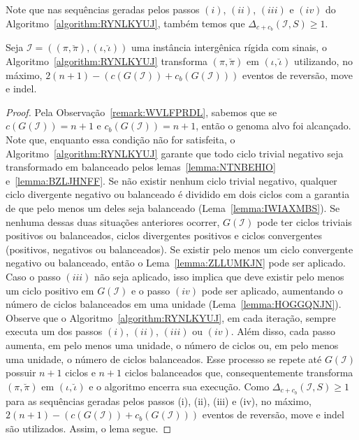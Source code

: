 Note que nas sequências geradas pelos passos $(i)$, $(ii)$, $(iii)$ e $(iv)$ do Algoritmo~\ref{algorithm:RYNLKYUJ}, também temos que $\Delta_{c+c_b}(\mathcal{I},S) \ge 1$.

\begin{lemma}\label{lemma:PBDEKMXG}
Seja $\mathcal{I} = ((\pi,\breve\pi),(\iota,\breve\iota))$ uma instância intergênica rígida com sinais, o Algoritmo~\ref{algorithm:RYNLKYUJ} transforma $(\pi,\breve\pi)$ em $(\iota,\breve\iota)$ utilizando, no máximo, $2(n + 1) - (c(G(\mathcal{I})) + c_b(G(\mathcal{I})))$ eventos de reversão, move e indel.
\end{lemma}
\begin{proof}
Pela Observação~\ref{remark:WVLFPRDL}, sabemos que se $c(G(\mathcal{I})) = {n + 1}$ e $c_b(G(\mathcal{I})) = {n + 1}$, então o genoma alvo foi alcançado. Note que, enquanto essa condição não for satisfeita, o Algoritmo~\ref{algorithm:RYNLKYUJ} garante que todo ciclo trivial negativo seja transformado em balanceado pelos lemas~\ref{lemma:NTNBEHIO} e~\ref{lemma:BZLJHNFF}. Se não existir nenhum ciclo trivial negativo, qualquer ciclo divergente negativo ou balanceado é dividido em dois ciclos com a garantia de que pelo menos um deles seja balanceado (Lema~\ref{lemma:IWIAXMBS}). Se nenhuma dessas duas situações anteriores ocorrer, $G(\mathcal{I})$ pode ter ciclos triviais positivos ou balanceados, ciclos divergentes positivos e ciclos convergentes (positivos, negativos ou balanceados). Se existir pelo menos um ciclo convergente negativo ou balanceado, então o Lema~\ref{lemma:ZLLUMKJN} pode ser aplicado. Caso o passo $(iii)$ não seja aplicado, isso implica que deve existir pelo menos um ciclo positivo em $G(\mathcal{I})$ e o passo $(iv)$ pode ser aplicado, aumentando o número de ciclos balanceados em uma unidade (Lema~\ref{lemma:HOGGQNJN}). Observe que o Algoritmo~\ref{algorithm:RYNLKYUJ}, em cada iteração, sempre executa um dos passos $(i)$, $(ii)$, $(iii)$ ou $(iv)$. Além disso, cada passo aumenta, em pelo menos uma unidade, o número de ciclos ou, em pelo menos uma unidade, o número de ciclos balanceados. Esse processo se repete até $G(\mathcal{I})$ possuir ${n+1}$ ciclos e ${n+1}$ ciclos balanceados que, consequentemente transforma $(\pi, \breve\pi)$ em $(\iota,\breve\iota)$ e o algoritmo encerra sua execução.  Como $\Delta_{c+c_b}(\mathcal{I},S) \ge 1$ para as sequências geradas pelos passos (i), (ii), (iii) e (iv), no máximo, $2(n + 1) - (c(G(\mathcal{I})) + c_b(G(\mathcal{I})))$ eventos de reversão, move e indel são utilizados. Assim, o lema segue.
\end{proof}

